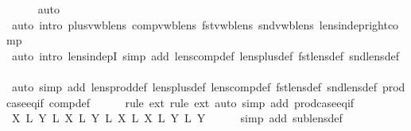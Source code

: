 \begin{isabellebody}
\ \ \ \ \isamarkupfalse%
\ {\isacharparenleft}auto{\isacharparenright}\isanewline
\ \ \ \ \isamarkupfalse%
\ {\isacharparenleft}auto\ intro{\isacharbang}{\isacharcolon}\ plus{\isacharunderscore}vwb{\isacharunderscore}lens\ comp{\isacharunderscore}vwb{\isacharunderscore}lens\ fst{\isacharunderscore}vwb{\isacharunderscore}lens\ snd{\isacharunderscore}vwb{\isacharunderscore}lens\ lens{\isacharunderscore}indep{\isacharunderscore}right{\isacharunderscore}comp{\isacharparenright}\isanewline
\ \ \ \ \isamarkupfalse%
\ {\isacharparenleft}auto\ intro{\isacharbang}{\isacharcolon}\ lens{\isacharunderscore}indepI\ simp\ add{\isacharcolon}\ lens{\isacharunderscore}comp{\isacharunderscore}def\ lens{\isacharunderscore}plus{\isacharunderscore}def\ fst{\isacharunderscore}lens{\isacharunderscore}def\ snd{\isacharunderscore}lens{\isacharunderscore}def{\isacharparenright}\isanewline
\ \ \ \ \isamarkupfalse%
\ {\isacharparenleft}auto\ simp\ add{\isacharcolon}\ lens{\isacharunderscore}prod{\isacharunderscore}def\ lens{\isacharunderscore}plus{\isacharunderscore}def\ lens{\isacharunderscore}comp{\isacharunderscore}def\ fst{\isacharunderscore}lens{\isacharunderscore}def\ snd{\isacharunderscore}lens{\isacharunderscore}def\ prod{\isachardot}case{\isacharunderscore}eq{\isacharunderscore}if\ comp{\isacharunderscore}def{\isacharparenright}{\isacharbrackleft}{}{\isacharbrackright}\isanewline
\ \ \ \ \isamarkupfalse%
\ {\isacharparenleft}rule\ ext{\isacharcomma}\ rule\ ext{\isacharcomma}\ auto\ simp\ add{\isacharcolon}\ prod{\isachardot}case{\isacharunderscore}eq{\isacharunderscore}if{\isacharparenright}\isanewline
\ \ \isamarkupfalse%
\isanewline
\ \ \isamarkupfalse%
\ {\isachardoublequoteopen}{\isacharparenleft}X\ {\isasymtimes}\isactrlsub L\ Y\ {\isacharplus}\isactrlsub L\ {\isacharparenleft}X\ {\isasymtimes}\isactrlsub L\ Y\ {\isasymsubseteq}\isactrlsub L\ {\isacharparenleft}X\ {\isacharplus}\isactrlsub L\ X\ {\isasymtimes}\isactrlsub L\ {\isacharparenleft}Y\ {\isacharplus}\isactrlsub L\ Y\isanewline
\ \ \ \ \isamarkupfalse%
\ {\isacharparenleft}simp\ add{\isacharcolon}\ sublens{\isacharunderscore}def{\isacharparenright}\isanewline

\end{isabellebody}
